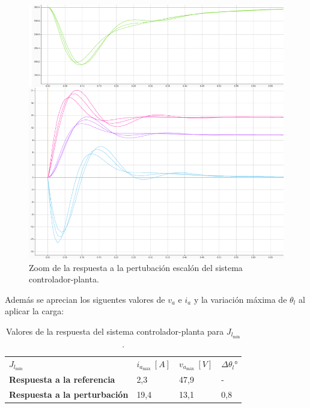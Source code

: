 \documentclass{article}
\begin{document}
\begin{sloppypar}
\begin{figure}[H]
    \centering
    \includegraphics[width=1\textwidth]{Zoom de la respuesta a la pertubación escalón del sistema controlador-planta}
    \caption{Zoom de la respuesta a la pertubación escalón del sistema controlador-planta.}
    \label{fig:Zoom de la respuesta a la pertubación escalón del sistema controlador-planta}
\end{figure}

Además se aprecian los siguentes valores de $v_a$ e $i_a$ y la variación máxima de $\theta_l$ al aplicar la carga:

\begin{table}[H]
    \centering
    \begin{tabular}{|l|l|l|l|}
    \cline{1-4}
    \textbf{$J_{l_{\text{mín}}}$}        & $i_{a_{\text{máx}}} ~[A]$ & $v_{a_{\text{máx}}} ~[V]$ & $\Delta\theta_l$° \\\cline{1-4}
    \textbf{Respuesta a la referencia}   & 2,3                       & 47,9                      & -                 \\\cline{1-4}
    \textbf{Respuesta a la perturbación} & 19,4                      & 13,1                      & 0,8               \\\cline{1-4}
    \end{tabular}
    \caption{\label{table:Valores de la respuesta del sistema controlador-planta para Jlmín}Valores de la respuesta del sistema controlador-planta para $J_{l_{\text{mín}}}$.}
\end{table}


\end{sloppypar}
\end{document}
